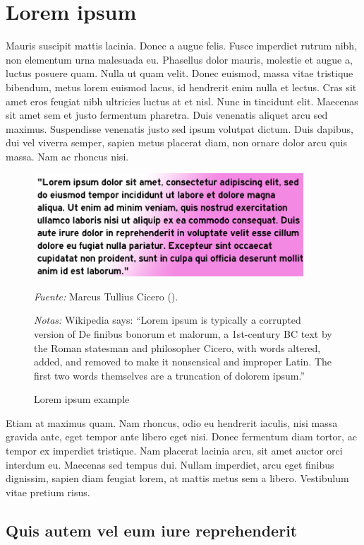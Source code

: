 \documentclass[
    a4paper,%
    DIV=calc,%
    abstract=true%
  ]{scrartcl}%
\newcommand{\source}[1]{\vspace{-9pt}\caption*{\footnotesize{\textit{Fuente:} {#1}}}}
\newcommand{\notes}[1]{\vspace{-9pt}\caption*{\footnotesize{\textit{Notas:} {#1}}}}
\begin{document}
  \section{Lorem ipsum}\label{lorem-ipsum}

  Mauris suscipit mattis lacinia. Donec a augue felis. Fusce imperdiet
  rutrum nibh, non elementum urna malesuada eu. Phasellus dolor mauris,
  molestie et augue a, luctus posuere quam. Nulla ut quam velit. Donec
  euismod, massa vitae tristique bibendum, metus lorem euismod lacus, id
  hendrerit enim nulla et lectus. Cras sit amet eros feugiat nibh
  ultricies luctus at et nisl. Nunc in tincidunt elit. Maecenas sit amet
  sem et justo fermentum pharetra. Duis venenatis aliquet arcu sed
  maximus. Suspendisse venenatis justo sed ipsum volutpat dictum. Duis
  dapibus, dui vel viverra semper, sapien metus placerat diam, non
  ornare dolor arcu quis massa. Nam ac rhoncus nisi.

  \begin{figure}
  \centering
  \includegraphics[width=0.9\textwidth]{./float/FIG_01}
  \caption{Lorem ipsum example}
  \source{Marcus Tullius Cicero (\citeproc{ref-27676}{1998, 45 BCE}).}
  \notes{Wikipedia says: “Lorem ipsum is typically a corrupted version of De finibus bonorum et malorum, a 1st-century BC text by the Roman statesman and philosopher Cicero, with words altered, added, and removed to make it nonsensical and improper Latin. The first two words themselves are a truncation of dolorem ipsum.”}
  \label{FIG_01}
  \end{figure}

  Etiam at maximus quam. Nam rhoncus, odio eu hendrerit iaculis, nisi
  massa gravida ante, eget tempor ante libero eget nisi. Donec fermentum
  diam tortor, ac tempor ex imperdiet tristique. Nam placerat lacinia
  arcu, sit amet auctor orci interdum eu. Maecenas sed tempus dui.
  Nullam imperdiet, arcu eget finibus dignissim, sapien diam feugiat
  lorem, at mattis metus sem a libero. Vestibulum vitae pretium risus.

  \subsection{Quis autem vel eum iure
  reprehenderit}\label{quis-autem-vel-eum-iure-reprehenderit}
\end{document}
